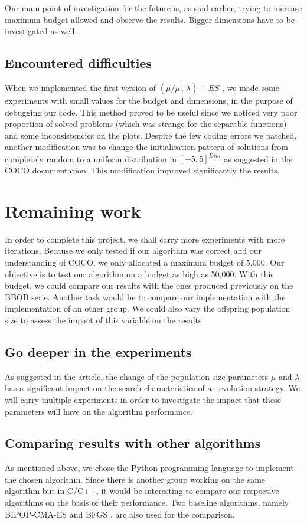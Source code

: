 \documentclass{article}
\begin{document}
Our main point of investigation for the future is, as said earlier, trying to increase maximum budget allowed and observe the results. Bigger dimensions have to be investigated as well.


\subsection{Encountered difficulties}
When we implemented the first version of   $(\mu / \mu \overset{+}{,} \lambda)-ES$ , we made some experiments with small values for the budget and dimensions, in the purpose of debugging our code. This method proved to be useful since we noticed very poor proportion of solved problems (which was strange for the separable functions) and some inconsistencies on the plots. Despite the few coding errors we patched, another modification was to change the initialisation pattern of solutions from completely random to a uniform distribution in $[-5,5]^{Dim}$ as suggested in the COCO documentation. This modification improved significantly the results.



\section{Remaining work}
In order to complete this project, we shall carry more experiments with more iterations. Because we only tested if our algorithm was correct and our understanding of COCO, we only allocated a maximum budget of 5,000. Our objective is to test our algorithm on a budget as high as 50,000. With this budget, we could compare our results with the ones produced previously on the BBOB serie. 
Another task would be to compare our implementation with the implementation of an other group. We could also vary the offspring population size to assess the impact of this variable on the results


\subsection{Go deeper in the experiments}
As suggested in the article, the change of the population size parameters $\mu$ and $\lambda$ has a significant impact on the search characteristics of an evolution strategy. We will carry multiple experiments in order to investigate the impact that these parameters will have on the algorithm performance.



\subsection{Comparing results with other algorithms}
As mentioned above, we chose the Python programming language to implement the chosen algorithm. Since there is another group working on the same algorithm but in C/C++, it would be interesting to compare our respective algorithms on the basis of their performance. Two baseline algorithms, namely BIPOP-CMA-ES \cite{hansen2009benchmarking} and BFGS \cite{ros2009benchmarking}, are also used for the comparison. 
\end{document}
